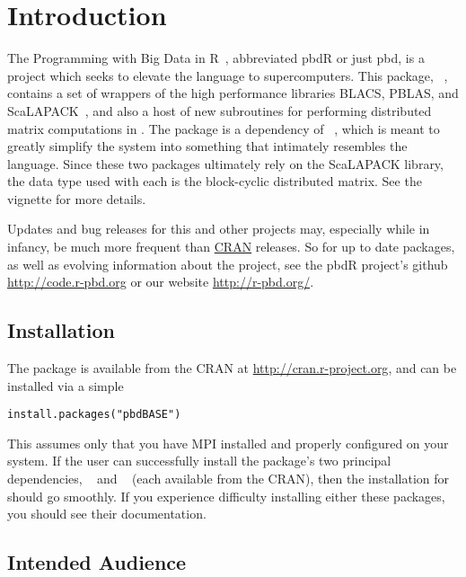 \section{Introduction}
\label{sec:introduction}

The Programming with Big Data in R~\citep{pbdr2012}, abbreviated pbdR or just pbd, is a project which seeks to elevate the  language to supercomputers.  This package, ~\citep{Schmidt2012pbdBASEpackage}, contains a set of wrappers of the high performance libraries BLACS, PBLAS, and ScaLAPACK~\citep{slug}, and also a host of new subroutines for performing distributed matrix computations in .  The package is a dependency of ~\citep{Schmidt2012pbdDMATpackage}, which is meant to greatly simplify the  system into something that intimately resembles the  language.  Since these two packages ultimately rely on the ScaLAPACK library, the data type used with each is the block-cyclic distributed matrix.  See the  vignette for more details.

Updates and bug releases for this and other  projects may, especially while in infancy, be much more frequent than \href{http://cran.r-project.org/}{CRAN} releases.  So for up to date packages, as well as evolving information about the  project,  see the pbdR project's github \url{http://code.r-pbd.org} or our website \href{http://r-pbd.org/}{http://r-pbd.org/}.


\subsection{Installation}
\label{sec:installation}

The  package is available from the CRAN at
\url{http://cran.r-project.org}, and can be installed via a simple 
\begin{lstlisting}[language=rr,title=Installing pbdBASE]
install.packages("pbdBASE")
\end{lstlisting}
This assumes only that you have MPI installed and properly configured on your system.  If the user can successfully install the package's two principal dependencies, ~\citep{Chen2012pbdMPIpackage} and ~\citep{Chen2012pbdSLAPpackage} (each available from the CRAN), then the installation for  should go smoothly.  If you experience difficulty installing either these packages, you should see their documentation.


\subsection{Intended Audience}
\label{sec:more_examples}

